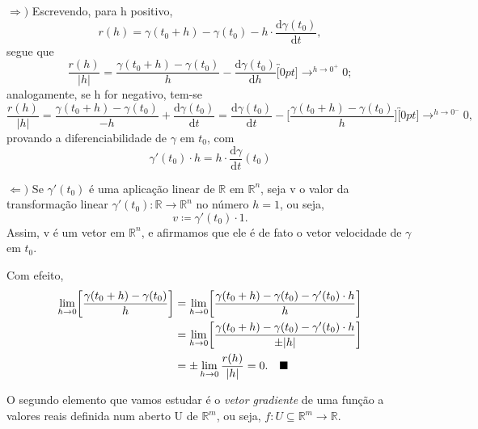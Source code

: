 \documentclass[../analysisII_notes.tex]{subfiles}
\begin{document}
\begin{proof*}
	\(\Rightarrow )\) Escrevendo, para h positivo,
	\[
		r(h) = \gamma(t_{0}+h) - \gamma(t_{0}) - h \cdot \frac{\mathrm{d}\gamma(t_{0})}{\mathrm{d}t},
	\]
	segue que
	\[
		\frac{r(h)}{|h|} = \frac{\gamma(t_{0}+h) - \gamma(t_{0})}{h} - \frac{\mathrm{d}\gamma (t_{0})}{\mathrm{d}h}\overbracket[0pt]{\longrightarrow}^{h\to 0^{+}}0;
	\]
	analogamente, se h for negativo, tem-se
	\[
		\frac{r(h)}{|h|} =\frac{\gamma(t_{0}+h) - \gamma(t_{0}) }{-h} + \frac{\mathrm{d}\gamma(t_{0})}{\mathrm{d}t} = \frac{\mathrm{d}\gamma(t_{0})}{\mathrm{d}t} -\biggl[\frac{\gamma(t_{0}+h)-\gamma(t_{0})}{h}\biggr]\overbracket[0pt]{\rightarrow}^{h\to 0^{-}}0,
	\]
	provando a diferenciabilidade de \(\gamma \) em \(t_{0}\), com
	\[
		\gamma'(t_{0})\cdot h = h \cdot \frac{\mathrm{d}\gamma }{\mathrm{d}t}(t_{0})
	\]

	\(\Leftarrow )\) Se \(\gamma'(t_{0})\) é uma aplicação linear de \(\mathbb{R}\) em \(\mathbb{R}^{n}\), seja v o valor da transformação linear \(\gamma'(t_{0}):\mathbb{R}\rightarrow \mathbb{R}^{n}\) no número \(h=1\), ou seja,
	\[
		v\coloneqq \gamma'(t_{0})\cdot 1.
	\]
	Assim, v é um vetor em \(\mathbb{R}^{n}\), e afirmamos que ele é de fato o vetor velocidade de \(\gamma \) em \(t_{0}\).

	Com efeito,
	\begin{align*}
		\lim_{h\to 0}\biggl[\frac{\gamma(t_{0}+h) - \gamma(t_{0})}{h}\biggr] & = \lim_{h\to 0}\biggl[\frac{\gamma(t_{0}+h)-\gamma(t_{0})-\gamma'(t_{0})\cdot h}{h}\biggr]         \\
		                                                                     & = \lim_{h\to 0}\biggl[\frac{\gamma(t_{0}+h) - \gamma(t_{0}) -\gamma'(t_{0})\cdot h}{\pm|h|}\biggr] \\
		                                                                     & = \pm\lim_{h\to 0}\frac{r(h)}{|h|}=0.\quad \text{$\blacksquare$}
	\end{align*}
\end{proof*}

O segundo elemento que vamos estudar é o \textit{vetor gradiente} de uma função  a valores reais definida num aberto U de \(\mathbb{R}^{m}\), ou seja, \(f:U\subseteq \mathbb{R}^{m}\rightarrow \mathbb{R}\).
\end{document}
